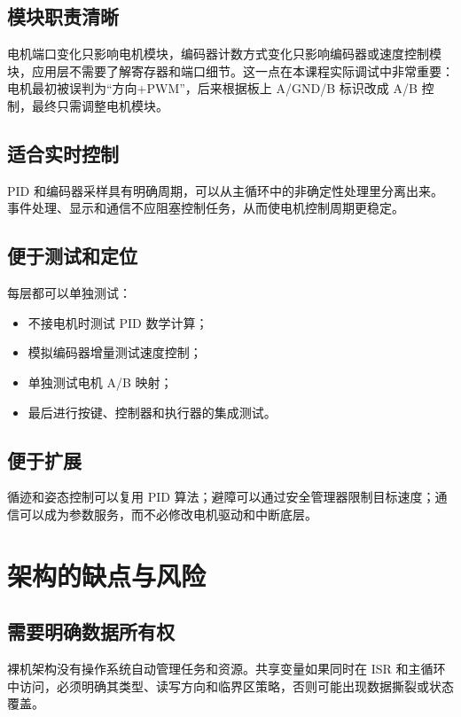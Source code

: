 \documentclass[11pt,a4paper,fontset=fandol]{ctexart}
\begin{document}
\subsection{模块职责清晰}

电机端口变化只影响电机模块，编码器计数方式变化只影响编码器或速度控制模块，应用层不需要了解寄存器和端口细节。这一点在本课程实际调试中非常重要：电机最初被误判为“方向+PWM”，后来根据板上 A/GND/B 标识改成 A/B 控制，最终只需调整电机模块。

\subsection{适合实时控制}

PID 和编码器采样具有明确周期，可以从主循环中的非确定性处理里分离出来。事件处理、显示和通信不应阻塞控制任务，从而使电机控制周期更稳定。

\subsection{便于测试和定位}

每层都可以单独测试：

\begin{itemize}
\item 不接电机时测试 PID 数学计算；
\item 模拟编码器增量测试速度控制；
\item 单独测试电机 A/B 映射；
\item 最后进行按键、控制器和执行器的集成测试。
\end{itemize}

\subsection{便于扩展}

循迹和姿态控制可以复用 PID 算法；避障可以通过安全管理器限制目标速度；通信可以成为参数服务，而不必修改电机驱动和中断底层。

\section{架构的缺点与风险}

\subsection{需要明确数据所有权}

裸机架构没有操作系统自动管理任务和资源。共享变量如果同时在 ISR 和主循环中访问，必须明确其类型、读写方向和临界区策略，否则可能出现数据撕裂或状态覆盖。
\end{document}
